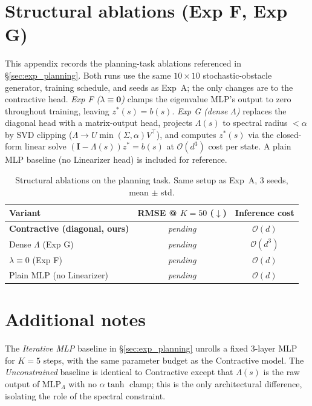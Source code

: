 \documentclass{article}
\newcommand{\zstar}{z^*}                     %
\newcommand{\spb}{\alpha}                    %
\newcommand{\eigs}{\lambda}                  %
\begin{document}
\section{Structural ablations (Exp F, Exp G)}
\label{app:ablations}
This appendix records the planning-task ablations referenced in
\S\ref{sec:exp_planning}.
Both runs use the same $10\!\times\!10$ stochastic-obstacle generator,
training schedule, and seeds as Exp~A; the only changes are to the
contractive head.
\emph{Exp F (}$\eigs\equiv\mathbf{0}$\emph{)} clamps the eigenvalue MLP's
output to zero throughout training, leaving $\zstar(s) = b(s)$.
\emph{Exp G (dense} $\Lambda$\emph{)} replaces the diagonal head with a
matrix-output head, projects $\Lambda(s)$ to spectral radius $<\spb$ by SVD
clipping ($\Lambda \to U\min(\Sigma,\spb)V^\top$), and computes
$\zstar(s)$ via the closed-form linear solve $(\mathbf{I}-\Lambda(s))\zstar = b(s)$
at $\mathcal{O}(d^3)$ cost per state.
A plain MLP baseline (no Linearizer head) is included for reference.

\begin{table}[h]
  \centering
  \caption{Structural ablations on the planning task. Same setup as Exp~A,
  3 seeds, mean $\pm$ std.}
  \label{tab:ablation_struct}
  \small
  \begin{tabular}{lcc}
    \toprule
    Variant & RMSE @ $K\!=\!50$ ($\downarrow$) & Inference cost \\
    \midrule
    \textbf{Contractive (diagonal, ours)} & \textit{pending} & $\mathcal{O}(d)$ \\
    Dense $\Lambda$ (Exp G)               & \textit{pending} & $\mathcal{O}(d^3)$ \\
    $\eigs \equiv 0$ (Exp F)              & \textit{pending} & $\mathcal{O}(d)$ \\
    Plain MLP (no Linearizer)             & \textit{pending} & $\mathcal{O}(d)$ \\
    \bottomrule
  \end{tabular}
\end{table}

\section{Additional notes}
\label{app:notes}
The \emph{Iterative MLP} baseline in \S\ref{sec:exp_planning} unrolls a fixed
3-layer MLP for $K=5$ steps, with the same parameter budget as the Contractive
model.
The \emph{Unconstrained} baseline is identical to Contractive except that
$\Lambda(s)$ is the raw output of $\mathrm{MLP}_\Lambda$ with no $\spb\tanh$
clamp; this is the only architectural difference, isolating the role of the
spectral constraint.

\newpage

\end{document}
